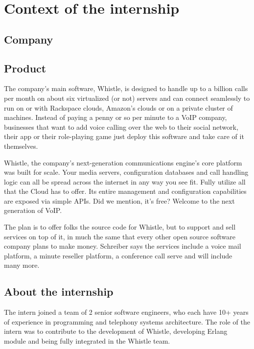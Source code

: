 \chapter{Context of the internship}
\label{ch:intro}

\section{Company}


\section{Product}
The company's main software, Whistle, is designed to handle up to a billion calls per month on about six virtualized (or not) servers and can connect seamlessly to run on or with Rackspace clouds, Amazon’s clouds or on a private cluster of machines. Instead of paying a penny or so per minute to a VoIP company, businesses that want to add voice calling over the web to their social network, their app or their role-playing game just deploy this software and take care of it themselves.

Whistle, the company's next-generation communications engine's core platform was built for scale. Your media servers, configuration databases and call handling logic can all be spread across the internet in any way you see fit. Fully utilize all that the Cloud has to offer. Its entire management and configuration capabilities are exposed via simple APIs. Did we mention, it's free? Welcome to the next generation of VoIP.

The plan is to offer folks the source code for Whistle, but to support and sell services on top of it, in much the same that every other open source software company plans to make money. Schreiber says the services include a voice mail platform, a minute reseller platform, a conference call serve and will include many more. 
 
\section{About the internship}
The intern joined a team of 2 senior software engineers, who each have 10+ years of experience in programming and telephony systems architecture. The role of the intern was to contribute to the development of Whistle, developing Erlang module and being fully integrated in the Whistle team.